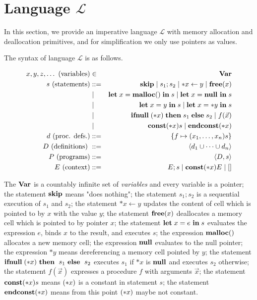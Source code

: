 
\section{Language \(\mathcal{L}\)}\label{sec:language}
In this section, we provide an imperative language \(\mathcal{L}\) with memory allocation and deallocation primitives, and for simplification we only use pointers as values.

The syntax of language \(\mathcal{L}\) is as follows.

\begin{eqnarray*}
  x,y,z,\dots \mbox{ (variables)} &\in& \mathbf{Var}\\
  s \mbox{ (statements)} & ::= &  \mathbf{skip} \mid s_{1};s_{2} \mid *x \leftarrow y \mid \mathbf{free}(x) \\
  & \mid & \mathbf{let}\; x = \mathbf{malloc()}\; \mathbf{in}\; s \mid \mathbf{let}\; x = \mathbf{null}\ \mathbf{in}\; s  \\
  & \mid & \mathbf{let}\; x = y \; \mathbf{in}\; s \mid   \mathbf{let}\; x = *y \; \mathbf{in}\; s \\
  & \mid & \mathbf{ifnull}\;(*x) \; \mathbf{then}\; s_{1}\; \mathbf{else}\; s_{2} \mid f(\vec{x})\\
  & \mid & \mathbf{const}(*x) s \mid \mathbf{endconst}(*x)  \\
  d \mbox{ (proc. defs.)} & ::= & \{f \mapsto (x_1,\dots,x_n)s\}\\
  D \mbox{ (definitions) } &::=& \langle d_1 \cup \dots \cup d_n \rangle\\
  P \mbox{ (programs)} &::=& \langle D, s \rangle\\
  E \mbox{ (context)} &::=& E;s \mid \mathbf{const}(*x) E \mid [ ] 
\end{eqnarray*}

The \(\mathbf{Var}\) is a countably infinite set of \emph{variables} and every
variable is a pointer; the statement \(\mathbf{skip}\) means "does nothing";
the statement \(s_1;s_2\) is a sequential execution of \(s_1\) and
\(s_2\); the statement \(*x \leftarrow y\) updates the content of cell
which is pointed to by \(x\) with the value \(y\); the statement
\(\mathbf{free}(x)\) deallocates a memory cell which is pointed to by pointer
\(x\); the statement \(\mathbf{let}\; x = e\ \mathbf{in}\; s\) evaluates the expression
\(e\), binds \(x\) to the result, and executes \(s\); the expression
\(\mathbf{malloc}()\) allocates a new memory cell; the expression \(\mathbf{null}\)
evaluates to the null pointer; the expression \(*y\) means
dereferencing a memory cell pointed by \(y\); the statement
\(\IFNULL(*x)\ \THEN\ s_1\ \ELSE\ s_2\) executes \(s_1\) if \(*x\) is
\(\mathbf{null}\) and executes \(s_2\) otherwise; the statement \(f(\vec{x})\)
expresses a procedure \(f\) with arguments \(\vec{x}\); the statement
\(\mathbf{const}(*x) s\) means \((*x)\) is a constant in statement \(s\); the
statement \(\mathbf{endconst}(*x)\) means from this point \((*x)\) maybe not
constant.

